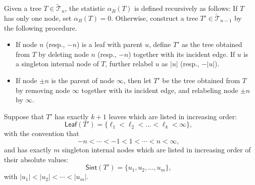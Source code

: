 \documentclass[12pt]{article}
\numberwithin{equation}{section}
\theoremstyle{plain}
\def\Leaf{\mathsf{Leaf}}
\def\Sint{\mathsf{Sint}}
\def\B{\mathcal{T}}
\begin{document}
	 	
	 	
	 	
	 	Given a  tree $T\in \widetilde{\B}_n$, the statistic $\alpha_B(T)$ is defined recursively as follows:
	 	If $T$ has only one node, set $\alpha_B(T)=0$.  Otherwise,  construct a tree $T'\in  \widetilde{\B}_{n-1}$ by the following procedure.
	 	\begin{itemize}
	 		\item If node $n$ (resp., $-n$) is a leaf with parent $u$, define $T'$ as the tree obtained from $T$ by deleting node $n$ (resp., $-n$) together with its incident edge.  If $u$ is a singleton internal node of $T$, further relabel  $u$ as $|u|$ (resp., $-|u|$).
	 		
	 		\item If  node $\pm n$ is the parent of  node $\infty$, then  let $T'$ be the tree obtained from $T$ by removing  node  $\infty$ together with its incident edge,  and relabeling  node  $\pm n$ by $\infty$.
	 	\end{itemize}
 	 	
	 	
	 	
	 Suppose that $T'$ has exactly $k+1$ leaves  which are listed in increasing order: $$\Leaf(T')=\{\ell_1<\ell_2< \ldots <\ell_k<\infty\}, $$ with the convention that
	 $$
	 -n<\cdots <-1<1<\cdots<n<\infty, 
	 $$ and has exactly $m$ singleton internal nodes which are listed in increasing order of their absolute values: $$\Sint(T')=\{u_1,u_2,\ldots,u_m\}, $$ with $ |u_1|<|u_2|<\cdots<|u_m|.$
	 
\end{document}
